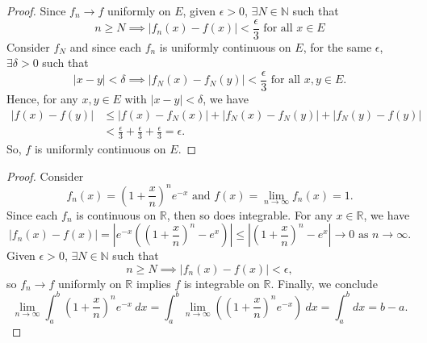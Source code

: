 \documentclass{report}
\begin{document}
\vspace{12pt}
\setcounter{Exercise}{5}
\begin{Exercise}
\begin{proof}
Since $f_n \to f$ uniformly on $E$, given $\epsilon > 0$, $\exists N\in\mathbb{N}$ such that $$n\geq N \implies \left| f_n(x)-f(x) \right| < \frac{\epsilon}{3}\mbox{ for all } x\in E$$
Consider $f_N$ and since each $f_n$ is uniformly continuous on $E$, for the same $\epsilon$, $\exists \delta>0$ such that $$\left| x-y \right| < \delta \implies \left| f_N(x)-f_N(y) \right| < \frac{\epsilon}{3}\mbox{ for all }x,y\in E.$$
Hence, for any $x, y\in E$ with $\left| x-y \right| < \delta$, we have
\begin{align*}
\left| f(x) - f(y) \right| 
&\leq \left| f(x) - f_N(x) \right| + \left| f_N(x) - f_N(y) \right| + \left| f_N(y) - f(y) \right| \\
&< \frac{\epsilon}{3} + \frac{\epsilon}{3} + \frac{\epsilon}{3} = \epsilon.
\end{align*}
So, $f$ is uniformly continuous on $E$.
\end{proof}
\end{Exercise}


\vspace{12pt}
\setcounter{Exercise}{7}
\begin{Exercise}
\begin{proof}
Consider $$f_n(x) = \left( 1+\frac{x}{n} \right)^n e^{-x}\text{ and } f(x)=\lim_{n\to\infty}f_n(x) = 1.$$
Since each $f_n$ is continuous on $\mathbb{R}$, then so does integrable.
For any $x\in\mathbb{R}$, we have $$ \left| f_n(x) - f(x) \right| =
\left| e^{-x} \left( \left( 1+\frac{x}{n} \right)^n - e^x \right) \right| \leq
\left| \left( 1+\frac{x}{n} \right)^n - e^x \right|
\to0 \mbox{ as } n\to\infty.$$
Given $\epsilon > 0$, $\exists N\in\mathbb{N}$ such that $$n \geq N \implies \left| f_n(x) - f(x) \right| < \epsilon,$$
so $f_n \to f$ uniformly on $\mathbb{R}$ implies $f$ is integrable on $\mathbb{R}$. Finally, we conclude $$\lim_{n\to\infty} \int_{a}^{b} \left( 1+\frac{x}{n} \right)^n e^{-x}\ dx =
\int_{a}^{b} \lim_{n\to\infty} \left( \left( 1+\frac{x}{n} \right)^n e^{-x}\right)\ dx =
\int_{a}^{b} dx =
b-a.$$
\end{proof}
\end{Exercise}
\end{document}
